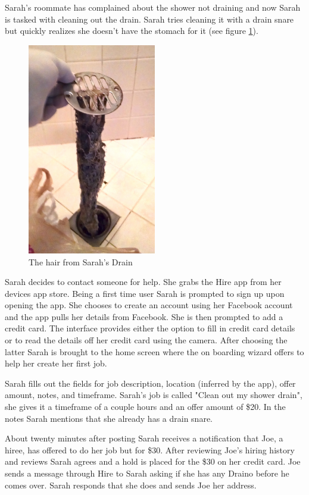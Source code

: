 \documentclass[11pt]{article}
\begin{document}
Sarah's roommate has complained about the shower not draining and now Sarah is tasked with cleaning out the drain. Sarah tries cleaning it with a drain snare but quickly realizes she doesn't have the stomach for it (see figure \ref{fig:sarahs-drain}).

\begin{figure}[htb]
    \centering
    \includegraphics[width=0.5\textwidth]{Img/showerhair}
    \caption{The hair from Sarah's Drain}\label{fig:sarahs-drain}
\end{figure} 

Sarah decides to contact someone for help. She grabs the Hire app from her devices app store. Being a first time user Sarah is prompted to sign up upon opening the app. She chooses to create an account using her Facebook account and the app pulls her details from Facebook. She is then prompted to add a credit card. The interface provides either the option to fill in credit card details or to read the details off her credit card using the camera. After choosing the latter Sarah is brought to the home screen where the on boarding wizard offers to help her create her first job. 

Sarah fills out the fields for job description, location (inferred by the app), offer amount, notes, and timeframe. Sarah's job is called "Clean out my shower drain", she gives it a timeframe of a couple hours and an offer amount of \$20. In the notes Sarah mentions that she already has a drain snare.

About twenty minutes after posting Sarah receives a notification that Joe, a hiree, has offered to do her job but for \$30. After reviewing Joe's hiring history and reviews Sarah agrees and a hold is placed for the \$30 on her credit card. Joe sends a message through Hire to Sarah asking if she has any Draino before he comes over. Sarah responds that she does and sends Joe her address. 
\end{document}
